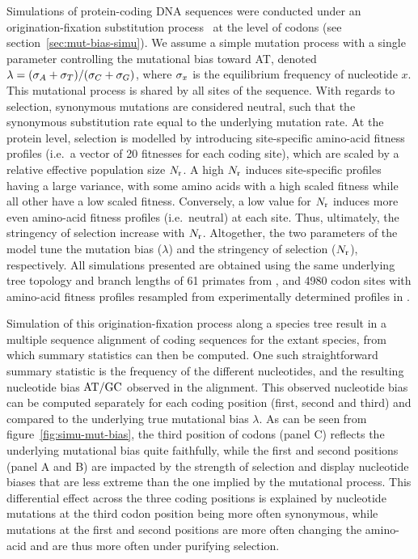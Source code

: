 \documentclass{article}
\begin{document}
Simulations of protein-coding {DNA} sequences were conducted under an origination-fixation {substitution} process~\citep{McCandlish2014} at the level of codons (see section~\ref{sec:mut-bias-simu}).
We assume a simple mutation process with a single parameter controlling the mutational bias toward AT, denoted $\lambda = (\sigma_A+\sigma_T)/(\sigma_C+\sigma_G)$, where $\sigma_x$ is the equilibrium frequency of nucleotide $x$.
This mutational process is shared by all sites of the sequence.
With regards to selection, {synonymous} mutations are considered {neutral}, such that the {synonymous} {substitution} rate equal to the underlying mutation rate.
At the protein level, selection is modelled by introducing site-specific amino-acid fitness profiles (i.e.~a vector of 20 fitnesses for each coding site), which are scaled by a relative effective population size $N_{\text{r}}$.
A high $N_{\text{r}}$ induces site-specific profiles having a large variance, with some amino acids with a high scaled fitness while all other have a low scaled fitness.
Conversely, a low value for $N_{\text{r}}$ induces more even amino-acid fitness profiles (i.e.~neutral) at each site.
Thus, ultimately, the stringency of selection increase with $N_{\text{r}}$.
Altogether, the two parameters of the model tune the mutation bias ($\lambda$) and the stringency of selection ($N_{\text{r}}$), respectively.
All simulations presented are obtained using the same underlying tree topology and branch lengths of 61 primates from \citet{Perelman2011}, and 4980 codon sites with amino-acid fitness profiles resampled from experimentally determined profiles in \citet{Bloom2017}.

Simulation of this origination-fixation process along a species tree result in a multiple sequence alignment of coding sequences for the extant species, from which summary statistics can then be computed.
One such straightforward summary statistic is the frequency of the different nucleotides, and the resulting nucleotide bias $\text{AT/GC}$ observed in the alignment.
This observed nucleotide bias can be computed separately for each coding position (first, second and third) and compared to the underlying true mutational bias $\lambda$.
As can be seen from figure~\ref{fig:simu-mut-bias}, the third position of codons (panel C) reflects the underlying mutational bias quite faithfully, while the first and second positions (panel A and B) are impacted by the strength of selection and display nucleotide biases that are less extreme than the one implied by the mutational process.
This differential effect across the three coding positions is explained by nucleotide mutations at the third codon position being more often {synonymous}, while mutations at the first and second positions are more often changing the amino-acid and are thus more often under purifying selection.
\end{document}
